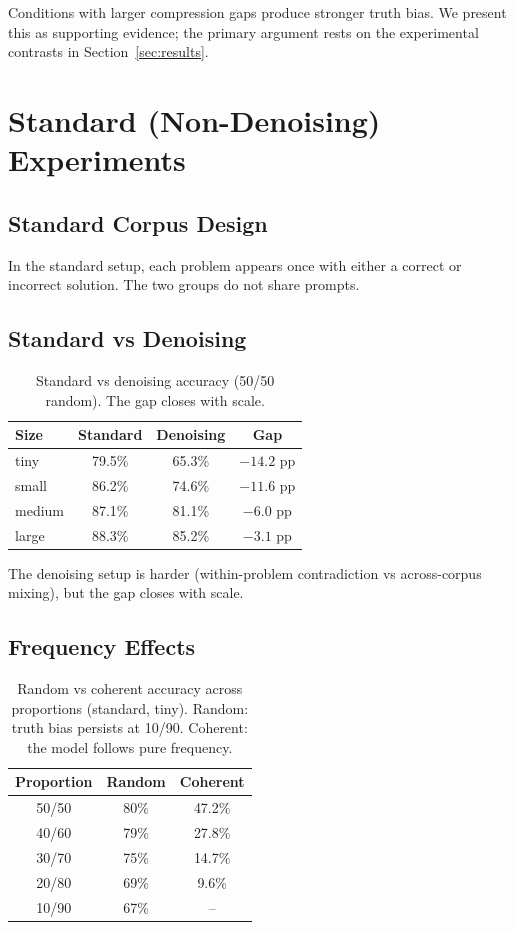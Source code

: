 \documentclass{article}
\begin{document}
Conditions with larger compression gaps produce stronger truth bias. We present this as supporting evidence; the primary argument rests on the experimental contrasts in Section~\ref{sec:results}.

\section{Standard (Non-Denoising) Experiments}
\label{app:standard}

\subsection{Standard Corpus Design}

In the standard setup, each problem appears once with either a correct or incorrect solution. The two groups do not share prompts.

\subsection{Standard vs Denoising}

\begin{table}[h]
\centering
\small
\begin{tabular}{lccc}
\toprule
Size & Standard & Denoising & Gap \\
\midrule
tiny   & 79.5\% & 65.3\% & $-14.2$ pp \\
small  & 86.2\% & 74.6\% & $-11.6$ pp \\
medium & 87.1\% & 81.1\% & $-6.0$ pp \\
large  & 88.3\% & 85.2\% & $-3.1$ pp \\
\bottomrule
\end{tabular}
\caption{Standard vs denoising accuracy (50/50 random). The gap closes with scale.}
\label{tab:standard_vs_denoising}
\end{table}

The denoising setup is harder (within-problem contradiction vs across-corpus mixing), but the gap closes with scale.

\subsection{Frequency Effects}

\begin{table}[h]
\centering
\small
\begin{tabular}{ccc}
\toprule
Proportion & Random & Coherent \\
\midrule
50/50 & 80\% & 47.2\% \\
40/60 & 79\% & 27.8\% \\
30/70 & 75\% & 14.7\% \\
20/80 & 69\% & 9.6\% \\
10/90 & 67\% & -- \\
\bottomrule
\end{tabular}
\caption{Random vs coherent accuracy across proportions (standard, tiny). Random: truth bias persists at 10/90. Coherent: the model follows pure frequency.}
\label{tab:frequency}
\end{table}
\end{document}
